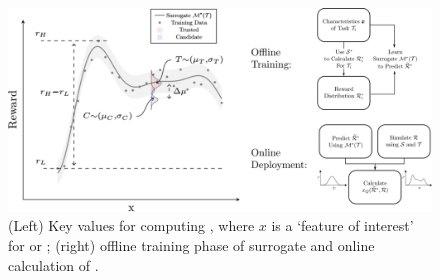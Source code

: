     
       \begin{figure}[tb]
        \centering
        \includegraphics[width=0.79\linewidth]{Figures/SQ_AllCombined.png}
        \caption{(Left) Key values for computing \xQ, where $x$ is a `feature of interest' for \task or \solve; (right) offline training phase of surrogate \surrogate{} and online calculation of \xQ{}. }
        \label{fig:sq_v3}
        \vspace{-0.2cm}
    \end{figure}
    
    
    